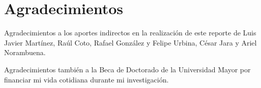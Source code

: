 \documentclass[aps,rmp,reprint,longbibliography]{revtex4-1}
\begin{document}
\section{Agradecimientos}
  Agradecimientos a los aportes indirectos en la realización de este reporte de Luis Javier Martínez, Raúl Coto, Rafael González y Felipe Urbina, César Jara y Ariel Norambuena.
  
  Agradecimientos también a la Beca de Doctorado de la Universidad Mayor por financiar mi vida cotidiana durante mi investigación.
\nocite{*}
 

\end{document}
